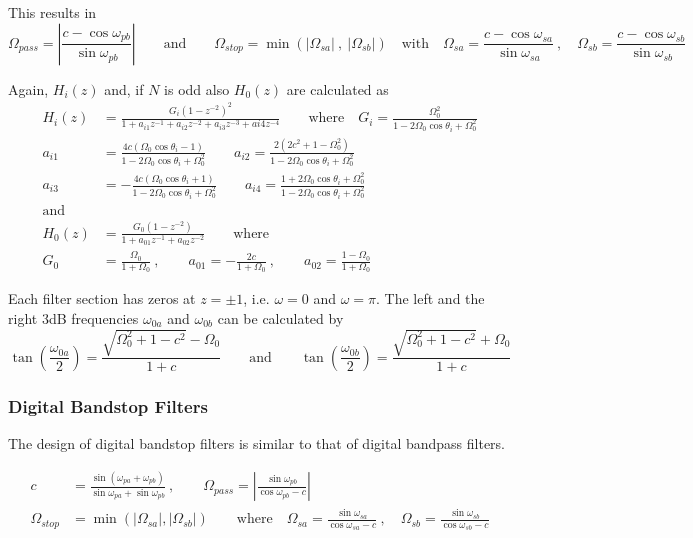 This results in
\begin{equation*}
	\Omega_{pass} = \left| \frac{c - \cos\omega_{pb}}{\sin\omega_{pb}} \right|
	\qquad \text{and} \qquad
	\Omega_{stop} = \min\left( |\Omega_{sa}|\:,\:|\Omega_{sb}| \right)
	\quad \text{with} \quad
	\Omega_{sa} = \frac{c-\cos\omega_{sa}}{\sin\omega_{sa}}\:, \quad
	\Omega_{sb} = \frac{c-\cos\omega_{sb}}{\sin\omega_{sb}}
\end{equation*}

Again, $H_i(z)$ and, if $N$ is odd also $H_0(z)$ are calculated as
\begin{align*}
	H_i(z) &= \frac{G_i (1-z^{-2})^2}{1 + a_{i1}z^{-1} + a_{i2}z^{-2} + a_{i3}z^{-3} + a{i4}z^{-4}}
	\qquad \text{where} \quad
	G_i = \frac{\Omega_0^2}{1-2\Omega_0\cos\theta_i+\Omega_0^2} \\
	a_{i1} &= \frac{4c(\Omega_0\cos\theta_i-1)}{1-2\Omega_0\cos\theta_i+\Omega_0^2} \qquad
	a_{i2} = \frac{2(2c^2+1-\Omega_0^2)}{1-2\Omega_0\cos\theta_i+\Omega_0^2} \\
	a_{i3} &= -\frac{4c(\Omega_0\cos\theta_i+1)}{1-2\Omega_0\cos\theta_i+\Omega_0^2} \qquad
	a_{i4} = \frac{1+2\Omega_0\cos\theta_i+\Omega_0^2}{1-2\Omega_0\cos\theta_i+\Omega_0^2} \\
	\text{and} \\
	H_0(z) &= \frac{G_0(1-z^{-2})}{1+a_{01}z^{-1}+a_{02}z^{-2}} \qquad \text{where} \\
	G_0 &= \frac{\Omega_0}{1+\Omega_0} \:,\qquad
	a_{01} = -\frac{2c}{1+\Omega_0} \:,\qquad
	a_{02} = \frac{1-\Omega_0}{1+\Omega_0}
\end{align*}

Each filter section has zeros at $z=\pm 1$, i.e. $\omega=0$ and $\omega=\pi$.
The left and the right 3dB frequencies $\omega_{0a}$ and $\omega_{0b}$ can be
calculated by
\begin{equation*}
	\tan\left(\frac{\omega_{0a}}{2}\right) = \frac{\sqrt{\Omega_0^2+1-c^2}-\Omega_0}{1+c}
	\qquad \text{and} \qquad
	\tan\left(\frac{\omega_{0b}}{2}\right) = \frac{\sqrt{\Omega_0^2+1-c^2}+\Omega_0}{1+c}
\end{equation*}

\subsubsection{Digital Bandstop Filters}
The design of digital bandstop filters is similar to that of digital
bandpass filters.

\begin{align*}
	c &= \frac{\sin(\omega_{pa}+\omega_{pb})}{\sin\omega_{pa}+\sin\omega_{pb}}
	\:,\qquad
	\Omega_{pass} = \left| \frac{\sin\omega_{pb}}{\cos\omega_{pb}-c} \right| \\
	\Omega_{stop} &= \min\left(|\Omega_{sa}|,|\Omega_{sb}|\right)
	\qquad \text{where} \quad
	\Omega_{sa} = \frac{\sin\omega_{sa}}{\cos\omega_{sa}-c}\:,\quad
	\Omega_{sb} = \frac{\sin\omega_{sb}}{\cos\omega_{sb}-c}
\end{align*}

